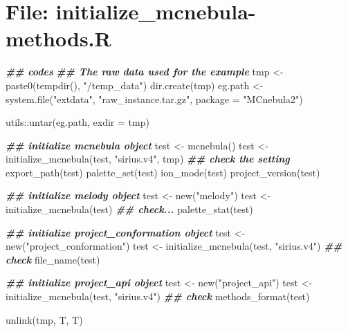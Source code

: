 \documentclass[
]{article}
\newenvironment{Shaded}{\begin{snugshade}}{\end{snugshade}}
\newcommand{\AttributeTok}[1]{\textcolor[rgb]{0.77,0.63,0.00}{#1}}
\newcommand{\DocumentationTok}[1]{\textcolor[rgb]{0.56,0.35,0.01}{\textbf{\textit{#1}}}}
\newcommand{\FunctionTok}[1]{\textcolor[rgb]{0.00,0.00,0.00}{#1}}
\newcommand{\NormalTok}[1]{#1}
\newcommand{\OtherTok}[1]{\textcolor[rgb]{0.56,0.35,0.01}{#1}}
\newcommand{\SpecialCharTok}[1]{\textcolor[rgb]{0.00,0.00,0.00}{#1}}
\newcommand{\StringTok}[1]{\textcolor[rgb]{0.31,0.60,0.02}{#1}}
\begin{document}
\hypertarget{file-initialize_mcnebula-methods.r}{%
\section{File: initialize\_mcnebula-methods.R}\label{file-initialize_mcnebula-methods.r}}

\begin{Shaded}
\begin{Highlighting}[]
\DocumentationTok{\#\# codes}
\DocumentationTok{\#\# The raw data used for the example}
\NormalTok{tmp }\OtherTok{\textless{}{-}} \FunctionTok{paste0}\NormalTok{(}\FunctionTok{tempdir}\NormalTok{(), }\StringTok{"/temp\_data"}\NormalTok{)}
\FunctionTok{dir.create}\NormalTok{(tmp)}
\NormalTok{eg.path }\OtherTok{\textless{}{-}} \FunctionTok{system.file}\NormalTok{(}\StringTok{"extdata"}\NormalTok{, }\StringTok{"raw\_instance.tar.gz"}\NormalTok{,}
                       \AttributeTok{package =} \StringTok{"MCnebula2"}\NormalTok{)}

\NormalTok{utils}\SpecialCharTok{::}\FunctionTok{untar}\NormalTok{(eg.path, }\AttributeTok{exdir =}\NormalTok{ tmp)}

\DocumentationTok{\#\# initialize \textquotesingle{}mcnebula\textquotesingle{} object}
\NormalTok{test }\OtherTok{\textless{}{-}} \FunctionTok{mcnebula}\NormalTok{()}
\NormalTok{test }\OtherTok{\textless{}{-}} \FunctionTok{initialize\_mcnebula}\NormalTok{(test, }\StringTok{"sirius.v4"}\NormalTok{, tmp)}
\DocumentationTok{\#\# check the setting}
\FunctionTok{export\_path}\NormalTok{(test)}
\FunctionTok{palette\_set}\NormalTok{(test)}
\FunctionTok{ion\_mode}\NormalTok{(test)}
\FunctionTok{project\_version}\NormalTok{(test)}

\DocumentationTok{\#\# initialize \textquotesingle{}melody\textquotesingle{} object}
\NormalTok{test }\OtherTok{\textless{}{-}} \FunctionTok{new}\NormalTok{(}\StringTok{"melody"}\NormalTok{)}
\NormalTok{test }\OtherTok{\textless{}{-}} \FunctionTok{initialize\_mcnebula}\NormalTok{(test)}
\DocumentationTok{\#\# check...}
\FunctionTok{palette\_stat}\NormalTok{(test)}

\DocumentationTok{\#\# initialize \textquotesingle{}project\_conformation\textquotesingle{} object}
\NormalTok{test }\OtherTok{\textless{}{-}} \FunctionTok{new}\NormalTok{(}\StringTok{"project\_conformation"}\NormalTok{)}
\NormalTok{test }\OtherTok{\textless{}{-}} \FunctionTok{initialize\_mcnebula}\NormalTok{(test, }\StringTok{"sirius.v4"}\NormalTok{)}
\DocumentationTok{\#\# check}
\FunctionTok{file\_name}\NormalTok{(test)}

\DocumentationTok{\#\# initialize \textquotesingle{}project\_api\textquotesingle{} object}
\NormalTok{test }\OtherTok{\textless{}{-}} \FunctionTok{new}\NormalTok{(}\StringTok{"project\_api"}\NormalTok{)}
\NormalTok{test }\OtherTok{\textless{}{-}} \FunctionTok{initialize\_mcnebula}\NormalTok{(test, }\StringTok{"sirius.v4"}\NormalTok{)}
\DocumentationTok{\#\# check}
\FunctionTok{methods\_format}\NormalTok{(test)}

\FunctionTok{unlink}\NormalTok{(tmp, T, T)}
\end{Highlighting}
\end{Shaded}
\end{document}
